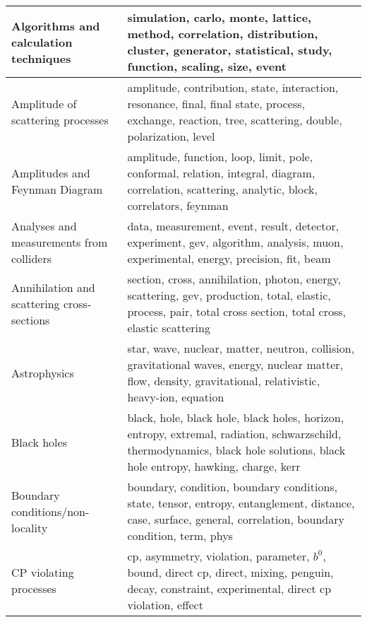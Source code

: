 \begin{longtable}[H]{p{}|p{}}
\bottomrule
\endlastfoot
Algorithms and calculation techniques                 &                                                               simulation, carlo, monte, lattice, method, correlation, distribution, cluster, generator, statistical, study, function, scaling, size, event \\ \midrule
Amplitude of scattering processes                     &                                                     amplitude, contribution, state, interaction, resonance, final, final state, process, exchange, reaction, tree, scattering, double, polarization, level \\ \midrule
Amplitudes and Feynman Diagram                        &                                                             amplitude, function, loop, limit, pole, conformal, relation, integral, diagram, correlation, scattering, analytic, block, correlators, feynman \\ \midrule
Analyses and measurements from colliders              &                                                                         data, measurement, event, result, detector, experiment, gev, algorithm, analysis, muon, experimental, energy, precision, fit, beam \\ \midrule
Annihilation and scattering cross-sections            &                                             section, cross, annihilation, photon, energy, scattering, gev, production, total, elastic, process, pair, total cross section, total cross, elastic scattering \\ \midrule
Astrophysics                                          &                                              star, wave, nuclear, matter, neutron, collision, gravitational waves, energy, nuclear matter, flow, density, gravitational, relativistic, heavy-ion, equation \\ \midrule
Black holes                                           &                                black, hole, black hole, black holes, horizon, entropy, extremal, radiation, schwarzschild, thermodynamics, black hole solutions, black hole entropy, hawking, charge, kerr \\ \midrule
Boundary conditions/non-locality                      &                                              boundary, condition, boundary conditions, state, tensor, entropy, entanglement, distance, case, surface, general, correlation, boundary condition, term, phys \\ \midrule
CP violating processes                                &                                                        cp, asymmetry, violation, parameter, $b^0$, bound, direct cp, direct, mixing, penguin, decay, constraint, experimental, direct cp violation, effect \\ \midrule

\end{longtable}

